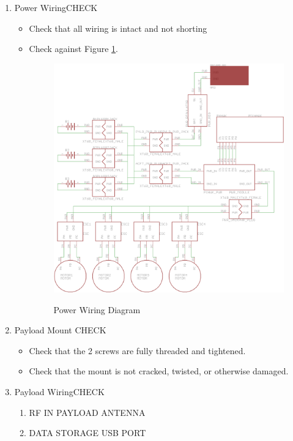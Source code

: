 \documentclass{report}
\begin{document}
\begin{enumerate}
\begin{enumerate}
				\end{enumerate}
			\item Power Wiring\hrulefill CHECK
				\begin{itemize}
					\item Check that all wiring is intact and not shorting
					\item Check against Figure \ref{fig:power_wiring_diag}.
						\begin{figure}[ht]
							\centering
							\caption{Power Wiring Diagram}
							\includegraphics[width=\textwidth]{power_wiring.png}
							\label{fig:power_wiring_diag}
						\end{figure}
				\end{itemize}
			\item Payload Mount \hrulefill CHECK
				\begin{itemize}
					\item Check that the 2 screws are fully threaded and tightened.
					\item Check that the mount is not cracked, twisted, or otherwise damaged.
				\end{itemize}
			\item Payload Wiring\hrulefill CHECK
				\begin{enumerate}
					\item RF IN \dotfill PAYLOAD ANTENNA
					\item DATA STORAGE \dotfill USB PORT

\end{enumerate}
\end{enumerate}
\end{document}
